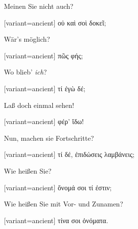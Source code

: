 Meinen Sie nicht auch?

\switchcolumn

\begin{greek}[variant=ancient]%
οὐ καὶ σοὶ δοκεῖ;

\end{greek}%
\switchcolumn*

Wär's möglich?

\switchcolumn

\begin{greek}[variant=ancient]%
πῶς φής;

\end{greek}%
\switchcolumn*

Wo blieb' \emph{ich}?

\switchcolumn

\begin{greek}[variant=ancient]%
τί ἐγὼ δέ;

\end{greek}%
\switchcolumn*

Laß doch einmal sehen!

\switchcolumn

\begin{greek}[variant=ancient]%
φέρ' ἴδω!

\end{greek}%
\switchcolumn*

Nun, machen sie Fort\textcompwordmark{}schritte?

\switchcolumn

\begin{greek}[variant=ancient]%
τί δέ, ἐπιδώσεις λαμβάνεις;

\end{greek}%
\indent Wie heißen Sie?

\switchcolumn

\begin{greek}[variant=ancient]%
ὄνομά σοι τί ἐστιν;

\end{greek}%
\switchcolumn*

Wie heißen Sie mit Vor- und Zunamen?

\switchcolumn

\begin{greek}[variant=ancient]%
τίνα σοι ὀνόματα.

\end{greek}%
\switchcolumn*

